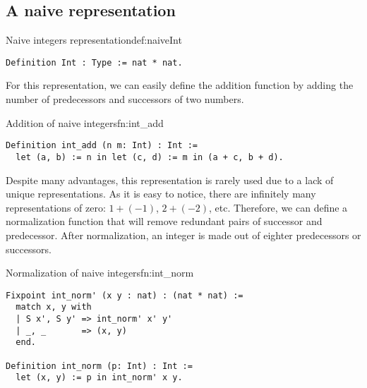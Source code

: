 \subsection{A naive representation}
\begin{defi}{Naive integers representation}{def:naiveInt}
\begin{verbatim}
Definition Int : Type := nat * nat.
\end{verbatim}
\end{defi}
For this representation, we can easily define the addition function by adding the number of predecessors and successors of two numbers.
\begin{func}{Addition of naive integers}{fn:int_add}
\begin{verbatim}
Definition int_add (n m: Int) : Int :=
  let (a, b) := n in let (c, d) := m in (a + c, b + d).
\end{verbatim}
\end{func}
Despite many advantages, this representation is rarely used due to a lack of unique representations. As it is easy to notice, there are infinitely many representations of zero: $1 + (-1)$, $2 + (-2)$, etc. Therefore, we can define a normalization function that will remove redundant pairs of successor and predecessor. After normalization, an integer is made out of eighter predecessors or successors.
\begin{func}{Normalization of naive integers}{fn:int_norm}
\begin{verbatim}
Fixpoint int_norm' (x y : nat) : (nat * nat) :=
  match x, y with
  | S x', S y' => int_norm' x' y'
  | _, _       => (x, y)
  end.

Definition int_norm (p: Int) : Int := 
  let (x, y) := p in int_norm' x y.
\end{verbatim}
\end{func}
